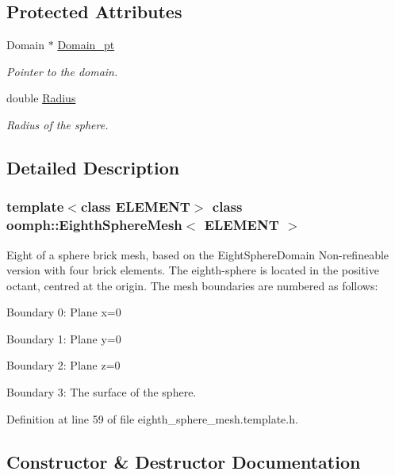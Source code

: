\subsection*{Protected Attributes}
\begin{DoxyCompactItemize}
\item 
Domain $\ast$ \hyperlink{classoomph_1_1EighthSphereMesh_a4b08d71a9da8cbd278cc51919cbb1a17}{Domain\+\_\+pt}
\begin{DoxyCompactList}\small\item\em Pointer to the domain. \end{DoxyCompactList}\item 
double \hyperlink{classoomph_1_1EighthSphereMesh_a6dbcd3a6d27416a0d9ef25cc631f6043}{Radius}
\begin{DoxyCompactList}\small\item\em Radius of the sphere. \end{DoxyCompactList}\end{DoxyCompactItemize}


\subsection{Detailed Description}
\subsubsection*{template$<$class E\+L\+E\+M\+E\+NT$>$\newline
class oomph\+::\+Eighth\+Sphere\+Mesh$<$ E\+L\+E\+M\+E\+N\+T $>$}

Eight of a sphere brick mesh, based on the Eight\+Sphere\+Domain Non-\/refineable version with four brick elements. The eighth-\/sphere is located in the positive octant, centred at the origin. The mesh boundaries are numbered as follows\+:
\begin{DoxyItemize}
\item Boundary 0\+: Plane x=0
\item Boundary 1\+: Plane y=0
\item Boundary 2\+: Plane z=0
\item Boundary 3\+: The surface of the sphere. 
\end{DoxyItemize}

Definition at line 59 of file eighth\+\_\+sphere\+\_\+mesh.\+template.\+h.



\subsection{Constructor \& Destructor Documentation}
\mbox{\label{classoomph_1_1EighthSphereMesh_a0457fc188d930a1e8853a3f0e1effbb3}} 
